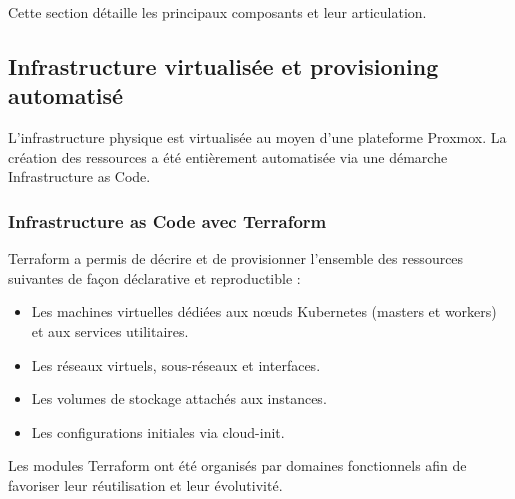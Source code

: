 Cette section détaille les principaux composants et leur articulation.

\subsection{Infrastructure virtualisée et provisioning automatisé}

L'infrastructure physique est virtualisée au moyen d'une plateforme Proxmox. La création des ressources a été entièrement automatisée via une démarche Infrastructure as Code.

\subsubsection*{Infrastructure as Code avec Terraform}

Terraform a permis de décrire et de provisionner l'ensemble des ressources suivantes de façon déclarative et reproductible :
\begin{itemize}
	\item Les machines virtuelles dédiées aux nœuds Kubernetes (masters et workers) et aux services utilitaires.
	\item Les réseaux virtuels, sous-réseaux et interfaces.
	\item Les volumes de stockage attachés aux instances.
	\item Les configurations initiales via cloud-init.
\end{itemize}

Les modules Terraform ont été organisés par domaines fonctionnels afin de favoriser leur réutilisation et leur évolutivité.

